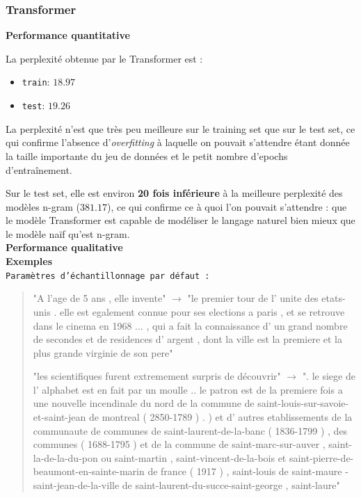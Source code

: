 \hypertarget{transformer}{%
\subsubsection{Transformer}\label{transformer}}

\noindent{}\textbf{Performance quantitative}

La perplexité obtenue par le Transformer est :

\begin{itemize}
\item
  \texttt{train}: \(18.97\)
\item
  \texttt{test}: \(19.26\)
\end{itemize}

La perplexité n'est que très peu meilleure sur le training set que sur
le test set, ce qui confirme l'absence d'\emph{overfitting} à laquelle
on pouvait s'attendre étant donnée la taille importante du jeu de
données et le petit nombre d'epochs d'entraînement.

Sur le test set, elle est environ \textbf{20 fois inférieure} à la
meilleure perplexité des modèles n-gram (\(381.17\)), ce qui confirme ce
à quoi l'on pouvait s'attendre : que le modèle Transformer est capable
de modéliser le langage naturel bien mieux que le modèle naïf qu'est
n-gram. \\

\noindent{}\textbf{Performance qualitative} \\

\textbf{Exemples} \\

\noindent{} \texttt{Paramètres d'échantillonnage par défaut :}

\begin{quotation}
"A l'age de 5 ans , elle invente" $\rightarrow$ "le premier tour de l' unite des etats-unis . elle est egalement connue pour ses elections a paris , et se retrouve dans le cinema en 1968 ... , qui a fait la connaissance d' un grand nombre de secondes et de residences d' argent , dont la ville est la premiere et la plus grande virginie de son pere"


"les scientifiques furent extremement surpris de découvrir" $\rightarrow$ ". le siege de l' alphabet est en fait par un moulle .. le patron est de la premiere fois a une nouvelle incendinale du nord de la commune de saint-louis-sur-savoie-et-saint-jean de montreal ( 2850-1789 ) . ) et d' autres etablissements de la communaute de communes de saint-laurent-de-la-banc ( 1836-1799 ) , des communes ( 1688-1795 ) et de la commune de saint-marc-sur-auver , saint-la-de-la-du-pon ou saint-martin , saint-vincent-de-la-bois et saint-pierre-de-beaumont-en-sainte-marin de france ( 1917 ) , saint-louis de saint-maure - saint-jean-de-la-ville de saint-laurent-du-succe-saint-george , saint-laure"
\end{quotation}

